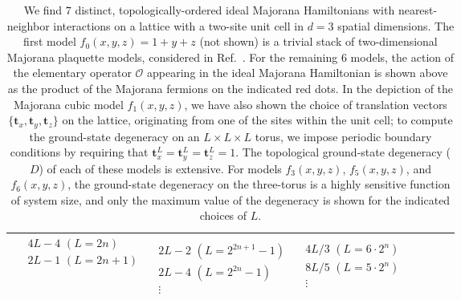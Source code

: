 \documentclass[aps,twocolumn,preprintnumbers,floatfix,showpacs,prx]{revtex4-1}
\begin{document}
\begin{table}
\begin{tabular}{|c|c|c|c|c|c|c|c|}
   & $\begin{array}{c}4L - 4\,\,(L = 2n)\\2L - 1\,\,(L = 2n+1)\end{array}$ 
   & $\begin{array}{c}\\2L - 2\,\,(L = 2^{2n+1} - 1)\\2L - 4\,\,(L = 2^{2n} - 1)\\\vdots\\\end{array}$
   & $\begin{array}{c}\\4L/3\,\,(L = 6\cdot 2^{n})\\8L/5\,\,(L = 5\cdot 2^{n})\\\vdots\\\end{array}$\\
   \hline
   \end{tabular}
 \caption{We find $7$ distinct, topologically-ordered ideal Majorana Hamiltonians
 with nearest-neighbor interactions on a lattice with a two-site unit cell in $d = 3$ spatial dimensions.
 The first model $f_{0}(x,y,z) = 1 + y + z$ (not shown) is a trivial stack of two-dimensional Majorana plaquette models, considered in Ref.~\cite{vijay}.
 For the remaining $6$ models, the action of the elementary operator $\mathcal{O}$
 appearing in the ideal Majorana Hamiltonian is shown above
 as the product of the Majorana fermions on the indicated red dots.
 In the depiction of the Majorana cubic model $f_{1}(x,y,z)$, we have also shown the choice of translation vectors $\{\boldsymbol{t}_{x},\boldsymbol{t}_{y},\boldsymbol{t}_{z}\}$ on the lattice,
 originating from one of the sites within the unit cell; to compute the ground-state degeneracy on an $L\times L\times L$ torus, we impose periodic boundary conditions by requiring that $\boldsymbol{t}_{x}^{L} = \boldsymbol{t}_{y}^{L} = \boldsymbol{t}_{z}^{L} = 1$.  The topological ground-state degeneracy ($D$) of each of these models is extensive.  For models $f_{3}(x,y,z)$, $f_{5}(x,y,z)$, and $f_{6}(x,y,z)$, the  
ground-state degeneracy on the three-torus is a highly sensitive function of system size, and only the maximum value of the degeneracy is shown for the indicated choices of $L$.
  }
 \label{table:3D_Majorana_Models}
\end{table}
\end{document}
